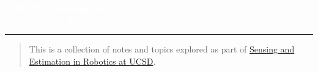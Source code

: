 \begin{titlepage}
    \BgThispage
    \vspace*{0.4\textheight}
    \noindent
    \textcolor{white}{\Huge\textbf{ECE 276A: Sensing and \\ Estimation in Robotics}}
    \vspace*{2cm}\par
    \noindent
    \begin{minipage}{0.35\linewidth}
        \begin{flushright}
            \printauthor
        \end{flushright}
    \end{minipage} \hspace{15pt}
    \begin{minipage}{0.02\linewidth}
        \rule{1pt}{175pt}
    \end{minipage} \hspace{10pt}
    \begin{minipage}{0.63\linewidth}
    \vspace{5pt}
        \begin{abstract} 
            This is a collection of notes and topics explored as part of \href{https://natanaso.github.io/ece276a/}{Sensing and Estimation in Robotics at UCSD}.
        \end{abstract}
    \end{minipage}
\end{titlepage}
\restoregeometry